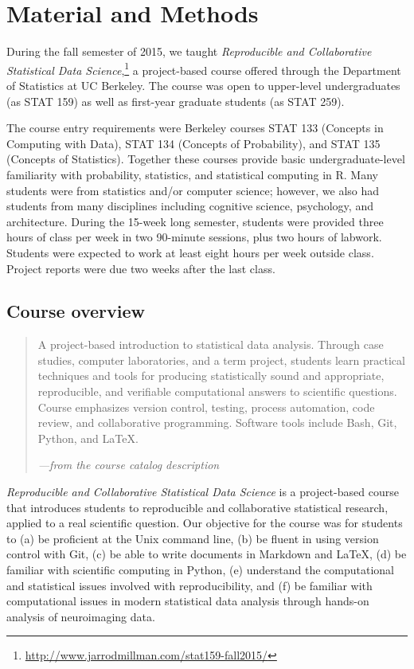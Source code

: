 \section{Material and Methods}\label{methods}

During the fall semester of 2015, we taught \emph{Reproducible and Collaborative
Statistical Data Science},\footnote{\url{http://www.jarrodmillman.com/stat159-fall2015/}}
a project-based course offered through the Department of Statistics at UC Berkeley.
The course was open to upper-level undergraduates (as STAT 159) as well as
first-year graduate students (as STAT 259).

The course entry requirements were Berkeley courses STAT 133 (Concepts in
Computing with Data), STAT 134 (Concepts of Probability), and STAT 135
(Concepts of Statistics).  Together these courses provide basic
undergraduate-level familiarity with probability, statistics, and statistical
computing in R.
Many students were from statistics and/or computer science; however, we also
had students from many disciplines including cognitive science, psychology, and
architecture.
During the 15-week long semester, students were provided three hours of class
per week in two 90-minute sessions, plus two hours of labwork.
Students were expected to work at least eight hours per week outside class.
Project reports were due two weeks after the last class.

\subsection{Course overview}

\begin{quote}
A project-based introduction to statistical data analysis. Through case
studies, computer laboratories, and a term project, students learn
practical techniques and tools for producing statistically sound and
appropriate, reproducible, and verifiable computational answers to
scientific questions. Course emphasizes version control, testing,
process automation, code review, and collaborative programming.
Software tools include Bash, Git, Python, and \LaTeX.

\hfill\emph{---from the course catalog description}
\end{quote}

\emph{Reproducible and Collaborative Statistical Data Science} is a
project-based course that introduces students to reproducible and collaborative
statistical research, applied to a real scientific question.
Our objective for the course was for students to
(a) be proficient at the Unix command line,
(b) be fluent in using version control with Git,
(c) be able to write documents in Markdown and \LaTeX,
(d) be familiar with scientific computing in Python,
(e) understand the computational and statistical issues involved with reproducibility, and
(f) be familiar with computational issues in modern statistical data
analysis through hands-on analysis of neuroimaging data.


